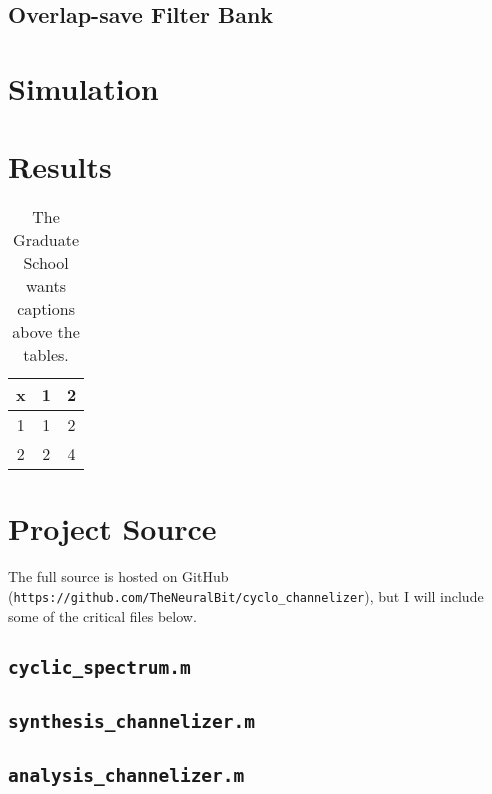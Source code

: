\documentclass[12pt,dvips]{report}
\begin{document}
\section{Overlap-save Filter Bank}
\label{sec:filter_bank}

\chapter{Simulation}
\label{sec:sim}

\chapter{Results}
\label{sec:results}

%
%

%

 \begin{table}
 \caption{The Graduate School wants captions above the tables.}
\begin{center}
 \begin{tabular}{ccc}
 x & 1 & 2 \\ \hline
 1 & 1 & 2 \\
 2 & 2 & 4 \\ \hline
 \end{tabular}
\end{center}
 \end{table}


%


\chapter{Project Source}
\label{sec:source}
The full source is hosted on GitHub (\texttt{https://github.com/TheNeuralBit/cyclo\_channelizer}), but I will include some of the critical files below.

\section{\texttt{cyclic\_spectrum.m}}

\section{\texttt{synthesis\_channelizer.m}}

\section{\texttt{analysis\_channelizer.m}}

\end{document}
